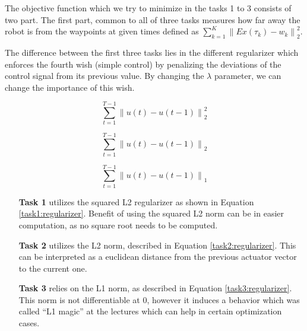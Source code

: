The objective function which we try to minimize in the tasks 1 to 3 consists of two part. The first part, common to all of three tasks measures how far away the robot is from the waypoints at given times defined as $\sum_{k = 1}^K \left\| E x( \tau_k ) - w_k \right\|_2^2$. 

The difference between the first three tasks lies in the different regularizer which enforces the fourth wish (simple control) by penalizing the deviations of the control signal from its previous value. By changing the $\lambda$ parameter, we can change the importance of this wish. 

\noindent
\begin{minipage}{.33\linewidth}
    \begin{equation}
        \label{task1:regularizer}
        \sum_{t = 1}^{T-1} \left\| u(t) - u(t-1) \right\|_2^2
    \end{equation}
\end{minipage}
\begin{minipage}{.33\linewidth}
    \begin{equation}
        \label{task2:regularizer}
        \sum_{t = 1}^{T-1} \left\| u(t) - u(t-1) \right\|_2
    \end{equation}
\end{minipage}
\begin{minipage}{.33\linewidth}
    \begin{equation}
        \label{task3:regularizer}
        \sum_{t = 1}^{T-1} \left\| u(t) - u(t-1) \right\|_1
    \end{equation}
\end{minipage}

\begin{itemize}
    \item[\textbf{Task 1}] utilizes the squared L2 regularizer as shown in Equation \ref{task1:regularizer}. Benefit of using the squared L2 norm can be in easier computation, as no square root needs to be computed.
    \item[\textbf{Task 2}] utilizes the L2 norm, described in Equation \ref{task2:regularizer}. This can be interpreted as a euclidean distance from the previous actuator vector to the current one.
    \item[\textbf{Task 3}] relies on the L1 norm, as described in Equation \ref{task3:regularizer}. This norm is not differentiable at 0, however it induces a behavior which was called ``L1 magic'' at the lectures which can help in certain optimization cases.
\end{itemize}

